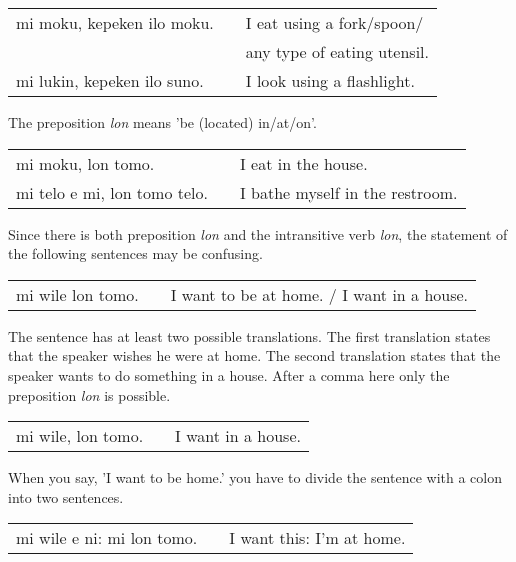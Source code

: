 \begin{supertabular}{p{5,5cm}|ll}
mi moku, kepeken ilo moku. && I eat using a fork/spoon/ \\ && any type of eating utensil. \\
mi lukin, kepeken ilo suno. && I look using a flashlight.  \\
\end{supertabular} 

%
%
The preposition \textit{lon} means 'be (located) in/at/on'.

\begin{supertabular}{p{5,5cm}|ll}
mi moku, lon tomo. && I eat in the house. \\
mi telo e mi, lon tomo telo. && I bathe myself in the restroom. \\
\end{supertabular} 

Since there is both preposition \textit{lon} and the intransitive verb \textit{lon}, the statement of the following sentences may be confusing.

\begin{supertabular}{p{5,5cm}|ll}
mi wile lon tomo. && I want to be at home. / I want in a house. \\
\end{supertabular} 

%
The sentence has at least two possible translations. 
The first translation states that the speaker wishes he were at home. 
The second translation states that the speaker wants to do something in a house. 
After a comma here only the preposition \textit{lon} is possible.

\begin{supertabular}{p{5,5cm}|ll}
mi wile, lon tomo. && I want in a house. \\
\end{supertabular}

When you say, 'I want to be home.' you have to divide the sentence with a colon into two sentences.

\begin{supertabular}{p{5,5cm}|ll}
mi wile e ni: mi lon tomo. && I want this: I'm at home. \\
\end{supertabular} 

